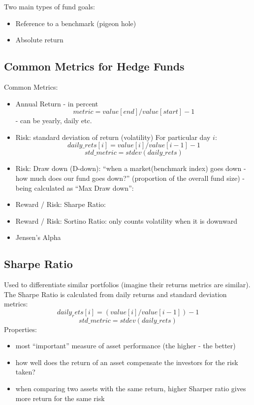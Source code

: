 \documentclass{scrartcl}
\begin{document}
Two main types of fund goals:
\begin{itemize}
\item Reference to a benchmark (pigeon hole)
\item Absolute return
\end{itemize}

\subsection{Common Metrics for Hedge Funds}
\label{sec:CommonMetricsHedgeFunds}
Common Metrics:
\begin{itemize}
\item Annual Return - in percent
$$ metric = value[end] / value[start] - 1$$
- can be yearly, daily etc.
\item Risk: standard deviation of return (volatility) For particular day $i$:
$$daily\_rets[i] = value[i]/value[i-1]-1$$
$$std\_metric = stdev(daily\_rets)$$
\item Risk: Draw down (D-down): ``when a market(benchmark index) goes down - how
  much does our fund goes down?'' (proportion of the overall fund size) - being
  calculated as ``Max Draw down'':
\item Reward / Risk: Sharpe Ratio:
\item Reward / Risk: Sortino Ratio: only counts volatility when it is downward
\item Jensen's Alpha
\end{itemize}


\subsection{Sharpe Ratio}
\label{sec:SharpeRatio}

Used to differentiate similar portfolios (imagine their returns metrics are
similar). The Sharpe Ratio is calculated from daily returns and standard
deviation metrics:
$$daily_rets[i] = (value[i]/value[i-1]) - 1$$
$$std\_metric = stdev(daily\_rets)$$
Properties:
\begin{itemize}
\item most ``important'' measure of asset performance (the higher - the better)
\item how well does the return of an asset compensate the investors for the risk
  taken?
\item when comparing two assets with the same return, higher Sharper ratio gives
  more return for the same risk
\end{itemize}
\end{document}
